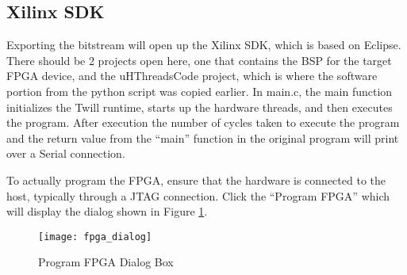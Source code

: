 \subsection{Xilinx SDK}
Exporting the bitstream will open up the Xilinx SDK, which is based on Eclipse. There should be 2 projects open here, one that contains the BSP for the target FPGA device, and the uHThreadsCode project, which is where the software portion from the python script was copied earlier. In main.c, the main function initializes the Twill runtime, starts up the hardware threads, and then executes the program. After execution the number of cycles taken to execute the program and the return value from the ``main'' function in the original program will print over a Serial connection.

To actually program the FPGA, ensure that the hardware is connected to the host, typically through a JTAG connection. Click the ``Program FPGA'' which will display the dialog shown in Figure \ref{fig:fpga_diag_box}.

\begin{figure}
	\centering
		\texttt{[image: fpga\_dialog]}
	\caption{Program FPGA Dialog Box\label{fig:fpga_diag_box}}
\end{figure}